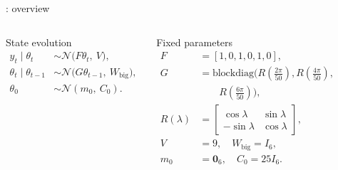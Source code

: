 \begin{frame}{\casetitleprefix: overview}
\begin{columns}[T,onlytextwidth]
  \begin{whiteblock}{\small State evolution}
    \scriptsize
    \[
    \begin{aligned}
      y_t \mid \theta_t &\sim \mathcal{N}\!\big(F\theta_t,\ V\big),\\
      \theta_t \mid \theta_{t-1} &\sim \mathcal{N}\!\big(G\theta_{t-1},\ W_{\text{big}}\big),\\
      \theta_0 &\sim \mathcal{N}(m_0,\ C_0).
    \end{aligned}
    \]
  \end{whiteblock}
  \begin{whiteblock}{\small Fixed parameters}
    \scriptsize
    \[
    \begin{aligned}
      F &= [1,0,1,0,1,0],\\
      G &= \mathrm{blockdiag}\!\big(R(\tfrac{2\pi}{50}),R(\tfrac{4\pi}{50}),\\
      &\qquad R(\tfrac{6\pi}{50})\big),\\
      R(\lambda) &= \begin{bmatrix}\cos\lambda&\sin\lambda\\ -\sin\lambda&\cos\lambda\end{bmatrix},\\
      V &= 9,\quad W_{\text{big}}=I_6,\\
      m_0 &= \mathbf{0}_6,\quad C_0=25I_6.
    \end{aligned}
    \]
  \end{whiteblock}
\end{columns}
\end{frame}
